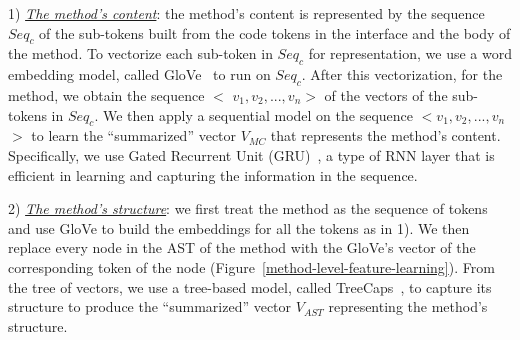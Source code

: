 1) {\em \underline{The method's content}}: the method's content is
represented by the sequence $Seq_c$ of the sub-tokens built from the
code tokens in the interface and the body of the method. To vectorize
each sub-token in $Seq_c$ for representation, we use a word embedding
model, called GloVe~\cite{glove2014} to run on $Seq_c$. After this
vectorization, for the method, we obtain the sequence $<$ $v_1, v_2,
..., v_n$$>$ of the vectors of the sub-tokens in $Seq_c$.  We then
apply a sequential model on the sequence $<$$v_1,v_2,...,v_n$$>$ to
learn the ``summarized'' vector $V_{MC}$ that represents the method's
content. Specifically, we use Gated Recurrent Unit
(GRU)~\cite{cho2014learning}, a type of RNN layer that is efficient in
learning and capturing the information in the sequence.


2) {\em \underline{The method's structure}}: we first treat the
method as the sequence of tokens and use GloVe to build
the embeddings for all the tokens as in 1). We then replace every node
in the AST of the method with the GloVe's vector of the corresponding
token of the node (Figure~\ref{method-level-feature-learning}).  From
the tree of vectors, we use a tree-based model, called
TreeCaps~\cite{bui2021treecaps}, to capture its structure to
produce the ``summarized'' vector $V_{AST}$ representing the
method's structure.

